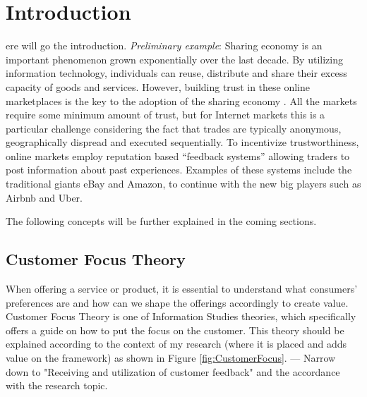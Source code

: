 %
%
\let\textcircled=\pgftextcircled
\chapter{Introduction}
\label{chap:intro}

ere will go the introduction. \textit{Preliminary example}: Sharing economy is an important phenomenon grown exponentially over the last decade. By utilizing information technology, individuals can reuse, distribute and share their excess capacity of goods and services. However, building trust in these online marketplaces is the key to the adoption of the sharing economy \cite{owen2014trust}. All the markets require some minimum amount of trust, but for Internet markets this is a particular challenge considering the fact that trades are typically anonymous, geographically dispread and executed sequentially. To incentivize trustworthiness, online markets employ reputation based “feedback systems” allowing traders to post information about past experiences. Examples of these systems include the traditional giants eBay and Amazon, to continue with the new big players such as Airbnb and Uber.

The following concepts will be further explained in the coming sections.
\section{Customer Focus Theory}
\label{sec:CFTH}

When offering a service or product, it is essential to understand what consumers' preferences are and how can we shape the offerings accordingly to create value. Customer Focus Theory is one of Information Studies theories, which specifically offers a guide on how to put the focus on the customer. This theory should be explained according to the context of my research (where it is placed and adds value on the framework) as shown in Figure \ref{fig:CustomerFocus}. 
--- Narrow down to "Receiving and utilization of customer feedback" and the accordance with the research topic.

